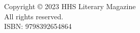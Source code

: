 \vspace*{\fill}
\begin{center}
    Copyright \copyright{} 2023 HHS Literary Magazine\\
    All rights reserved.\\
    ISBN: 9798392654864
\end{center}
